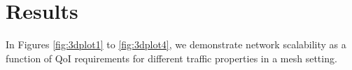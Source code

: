
\section{Results}
\label{sec:results}

In Figures \ref{fig:3dplot1} to \ref{fig:3dplot4}, we demonstrate network scalability as a function of QoI requirements for different traffic properties in a mesh setting.



